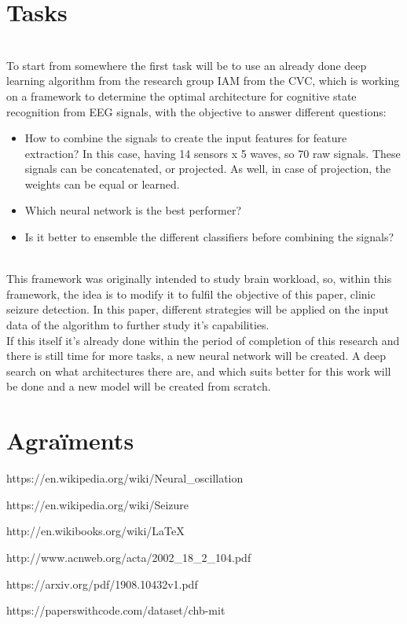 ﻿\documentclass[10pt,a4paper,twocolumn,twoside]{article}
\begin{document}
\section{Tasks}
\label{sec-tasks}
\\
To start from somewhere the first task will be to use an already done deep learning algorithm from the research group IAM from the CVC, which is working on a framework to determine the optimal architecture for cognitive state recognition from EEG signals, with the objective to answer different questions:
\begin{itemize}
  \item How to combine the signals to create the input features for feature extraction? In this case, having 14 sensors x 5 waves, so 70 raw signals. These signals can be concatenated, or projected. As well, in case of projection, the weights can be equal or learned.
  \item Which neural network is the best performer?
  \item Is it better to ensemble the different classifiers before combining the signals?
\end{itemize}
\leavevmode\\
This framework was originally intended to study brain workload, so, within this framework, the idea is to modify it to fulfil the objective of this paper, clinic seizure detection. In this paper, different strategies will be applied on the input data of the algorithm to further study it’s capabilities.
\\
If this itself it’s already done within the period of completion of this research and there is still time for more tasks, a new neural network will be created. A deep search on what architectures there are, and which suits better for this work will be done and a new model will be created from scratch.



\section*{Agraïments}

\begin{thebibliography}{11}

https://en.wikipedia.org/wiki/Neural\_oscillation

https://en.wikipedia.org/wiki/Seizure

http://en.wikibooks.org/wiki/LaTeX

http://www.acnweb.org/acta/2002\_18\_2\_104.pdf

https://arxiv.org/pdf/1908.10432v1.pdf

https://paperswithcode.com/dataset/chb-mit



\end{thebibliography}
\end{document}

